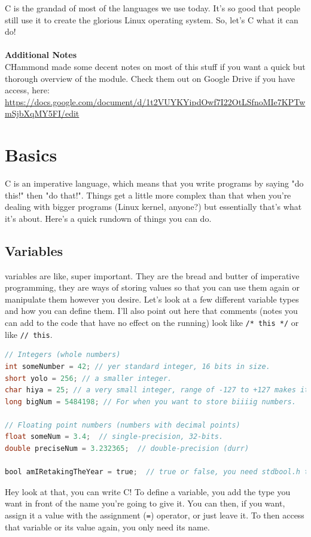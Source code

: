 C is the grandad of most of the languages we use today. It's so good that people still use it to create the glorious Linux operating system. So, let's C what it can do!
\\
\\
\textbf{Additional Notes}\\
CHammond made some decent notes on most of this stuff if you want a quick but thorough overview of the module. Check them out on Google Drive if you have access, here: \url{https://docs.google.com/document/d/1t2VUYKYipdOwf7I22OtLSfnoMIe7KPTwmSjbXqMY5FI/edit}

\section{Basics}
C is an \gls{imperative} language, which means that you write programs by saying "do this!" then "do that!". Things get a little more complex than that when you're dealing with bigger programs (Linux kernel, anyone?) but essentially that's what it's about. Here's a quick rundown of things you can do.

\subsection{Variables}
\Glspl{variable} are like, super important. They are the bread and butter of imperative programming, they are ways of storing values so that you can use them again or manipulate them however you desire. Let's look at a few different variable types and how you can define them. I'll also point out here that comments (notes you can add to the code that have no effect on the running) look like \texttt{/* this */} or like \texttt{// this}.
\begin{lstlisting}[language=C]
// Integers (whole numbers)
int someNumber = 42; // yer standard integer, 16 bits in size.
short yolo = 256; // a smaller integer.
char hiya = 25; // a very small integer, range of -127 to +127 makes it awesome for text characters.
long bigNum = 5484198; // For when you want to store biiiig numbers.

// Floating point numbers (numbers with decimal points)
float someNum = 3.4;  // single-precision, 32-bits.
double preciseNum = 3.232365;  // double-precision (durr)

bool amIRetakingTheYear = true;  // true or false, you need stdbool.h though.
\end{lstlisting}

Hey look at that, you can write C! To define a variable, you add the type you want in front of the name you're going to give it. You can then, if you want, assign it a value with the assignment (\texttt{=}) operator, or just leave it. To then access that variable or its value again, you only need its name.

